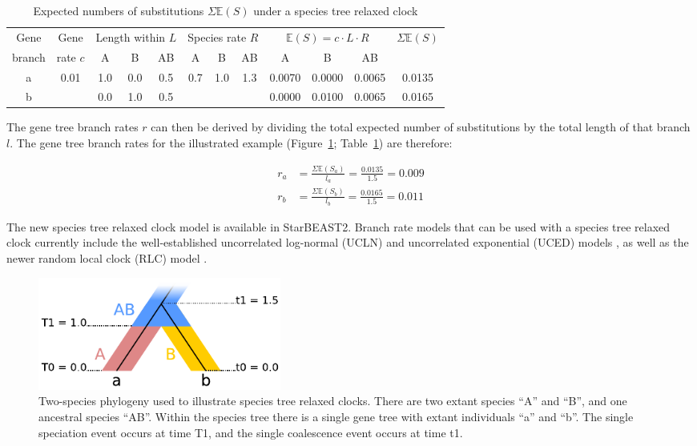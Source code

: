 \documentclass[12pt]{article}
\begin{document}
\begin{table}[htb!]
\caption{Expected numbers of substitutions $\Sigma \mathbb{E}(S)$ under a species tree relaxed clock}
\label{tab:branchRateModel}
\begin{threeparttable}
\begin{tabular*}{\textwidth}{@{\extracolsep{\fill}}cccccccccccc@{}}
\hline
Gene & Gene & \multicolumn{3}{c}{Length within $L$} & \multicolumn{3}{c}{Species rate $R$} & \multicolumn{3}{c}{$\mathbb{E}(S) = c\cdot L\cdot R$} & \multirow{2}{*}{$\Sigma \mathbb{E}(S)$}\tabularnewline
branch & rate $c$ & A & B & AB & A & B & AB & A & B & AB & \tabularnewline
\hline
a & \multirow{2}{*}{0.01} & 1.0 & 0.0 & 0.5 & \multirow{2}{*}{0.7} & \multirow{2}{*}{1.0} & \multirow{2}{*}{1.3} & 0.0070 & 0.0000 & 0.0065 & 0.0135\tabularnewline
b & & 0.0 & 1.0 & 0.5 & & & & 0.0000 & 0.0100 & 0.0065 & 0.0165\tabularnewline
\hline
\end{tabular*}
\end{threeparttable}
\end{table}

The gene tree branch rates $r$ can then be derived by dividing the total
expected number of substitutions by the total length of that branch $l$. The
gene tree branch rates for the illustrated example
(Figure~\ref{fig:branchRateModel}; Table~\ref{tab:branchRateModel}) are
therefore:

\begin{align}
r_a &= \frac{\Sigma \mathbb{E}(S_a)}{l_a} = \frac{0.0135}{1.5} = 0.009\\
r_b &= \frac{\Sigma \mathbb{E}(S_b)}{l_b} = \frac{0.0165}{1.5} = 0.011
\end{align}

The new species tree relaxed clock model is available in StarBEAST2. Branch rate
models that can be used with a species tree relaxed clock currently include the
well-established uncorrelated log-normal (UCLN) and uncorrelated exponential
(UCED) models \citep{10.1371/journal.pbio.0040088}, as well as the newer random
local clock (RLC) model \citep{Drummond2010}.

\begin{figure}[htb!]
\centering
\includegraphics[width=8cm]{relaxed_clock.pdf}
\caption
{Two-species phylogeny used to illustrate species tree relaxed
clocks. There are two extant species ``A'' and ``B'', and one ancestral species ``AB''.
Within the species tree there is a single gene tree with extant individuals ``a''
and ``b''. The single speciation event occurs at time T1, and the single coalescence
event occurs at time t1.}
\label{fig:branchRateModel}
\end{figure}
\end{document}
